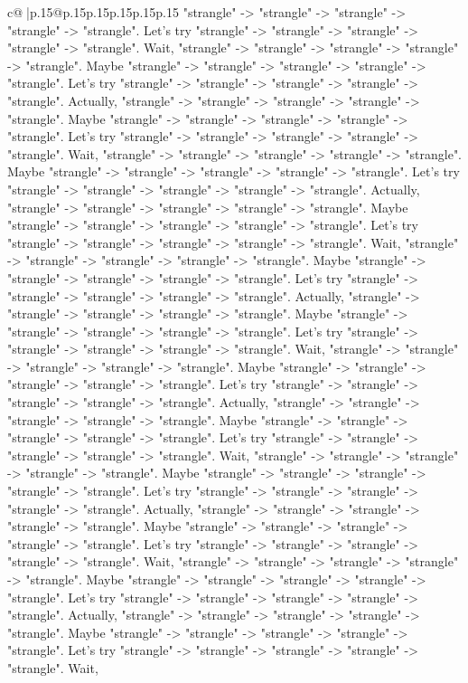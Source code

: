 \documentclass{article}
\begin{document}
{\begin{supertabular}{c@{$\;$}|p{.15\linewidth}@{}p{.15\linewidth}p{.15\linewidth}p{.15\linewidth}p{.15\linewidth}p{.15\linewidth}}
{{{"strangle" {-}> "strangle" {-}> "strangle" {-}> "strangle" {-}> "strangle". Let's try "strangle" {-}> "strangle" {-}> "strangle" {-}> "strangle" {-}> "strangle". Wait, "strangle" {-}> "strangle" {-}> "strangle" {-}> "strangle" {-}> "strangle". Maybe "strangle" {-}> "strangle" {-}> "strangle" {-}> "strangle" {-}> "strangle". Let's try "strangle" {-}> "strangle" {-}> "strangle" {-}> "strangle" {-}> "strangle". Actually, "strangle" {-}> "strangle" {-}> "strangle" {-}> "strangle" {-}> "strangle". Maybe "strangle" {-}> "strangle" {-}> "strangle" {-}> "strangle" {-}> "strangle". Let's try "strangle" {-}> "strangle" {-}> "strangle" {-}> "strangle" {-}> "strangle". Wait, "strangle" {-}> "strangle" {-}> "strangle" {-}> "strangle" {-}> "strangle". Maybe "strangle" {-}> "strangle" {-}> "strangle" {-}> "strangle" {-}> "strangle". Let's try "strangle" {-}> "strangle" {-}> "strangle" {-}> "strangle" {-}> "strangle". Actually, "strangle" {-}> "strangle" {-}> "strangle" {-}> "strangle" {-}> "strangle". Maybe "strangle" {-}> "strangle" {-}> "strangle" {-}> "strangle" {-}> "strangle". Let's try "strangle" {-}> "strangle" {-}> "strangle" {-}> "strangle" {-}> "strangle". Wait, "strangle" {-}> "strangle" {-}> "strangle" {-}> "strangle" {-}> "strangle". Maybe "strangle" {-}> "strangle" {-}> "strangle" {-}> "strangle" {-}> "strangle". Let's try "strangle" {-}> "strangle" {-}> "strangle" {-}> "strangle" {-}> "strangle". Actually, "strangle" {-}> "strangle" {-}> "strangle" {-}> "strangle" {-}> "strangle". Maybe "strangle" {-}> "strangle" {-}> "strangle" {-}> "strangle" {-}> "strangle". Let's try "strangle" {-}> "strangle" {-}> "strangle" {-}> "strangle" {-}> "strangle". Wait, "strangle" {-}> "strangle" {-}> "strangle" {-}> "strangle" {-}> "strangle". Maybe "strangle" {-}> "strangle" {-}> "strangle" {-}> "strangle" {-}> "strangle". Let's try "strangle" {-}> "strangle" {-}> "strangle" {-}> "strangle" {-}> "strangle". Actually, "strangle" {-}> "strangle" {-}> "strangle" {-}> "strangle" {-}> "strangle". Maybe "strangle" {-}> "strangle" {-}> "strangle" {-}> "strangle" {-}> "strangle". Let's try "strangle" {-}> "strangle" {-}> "strangle" {-}> "strangle" {-}> "strangle". Wait, "strangle" {-}> "strangle" {-}> "strangle" {-}> "strangle" {-}> "strangle". Maybe "strangle" {-}> "strangle" {-}> "strangle" {-}> "strangle" {-}> "strangle". Let's try "strangle" {-}> "strangle" {-}> "strangle" {-}> "strangle" {-}> "strangle". Actually, "strangle" {-}> "strangle" {-}> "strangle" {-}> "strangle" {-}> "strangle". Maybe "strangle" {-}> "strangle" {-}> "strangle" {-}> "strangle" {-}> "strangle". Let's try "strangle" {-}> "strangle" {-}> "strangle" {-}> "strangle" {-}> "strangle". Wait, "strangle" {-}> "strangle" {-}> "strangle" {-}> "strangle" {-}> "strangle". Maybe "strangle" {-}> "strangle" {-}> "strangle" {-}> "strangle" {-}> "strangle". Let's try "strangle" {-}> "strangle" {-}> "strangle" {-}> "strangle" {-}> "strangle". Actually, "strangle" {-}> "strangle" {-}> "strangle" {-}> "strangle" {-}> "strangle". Maybe "strangle" {-}> "strangle" {-}> "strangle" {-}> "strangle" {-}> "strangle". Let's try "strangle" {-}> "strangle" {-}> "strangle" {-}> "strangle" {-}> "strangle". Wait, }}}
\end{supertabular}}
\end{document}
